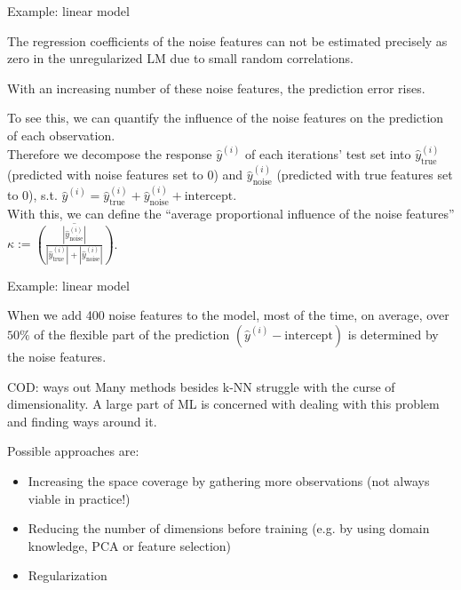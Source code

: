 \documentclass[11pt,compress,t,notes=noshow, xcolor=table]{beamer}
\begin{document}
\begin{framei}{Example: linear model}
\item The regression coefficients of the noise features can not be estimated precisely as zero in the unregularized LM due to small random correlations.
\item With an increasing number of these noise features, the prediction error rises.
\item To see this, we can quantify the influence of the noise features on the prediction of each observation. \\
Therefore we decompose the response $\hat y^{(i)}$ of each iterations' test set into $\hat y^{(i)}_{\text{true}}$ (predicted with noise features set to 0) and $\hat y^{(i)}_{\text{noise}}$ (predicted with true features set to 0), s.t. $\hat y^{(i)} =  \hat y^{(i)}_{\text{true}} + \hat y^{(i)}_{\text{noise}} + \text{intercept}$. \\
With this, we can define the \enquote{average proportional influence of the noise features} $\kappa := \overline{( \frac{|\hat y^{(i)}_{\text{noise}}|}{|\hat y^{(i)}_{\text{true}}| + |\hat y^{(i)}_{\text{noise}}|} )}$.
\end{framei}

\begin{framev}{Example: linear model}

When we add 400 noise features to the model, most of the time, on average, over $50\%$ of the flexible part of the prediction $(\hat y^{(i)} - \text{intercept})$ is determined by the noise features.
\end{framev}

\begin{framev}{COD: ways out}
Many methods besides k-NN struggle with the curse of dimensionality. A large part of ML is concerned with dealing with this problem and finding ways around it.

\vfill

Possible approaches are:
\begin{itemize}
\item Increasing the space coverage by gathering more observations (not always viable in practice!)
\item Reducing the number of dimensions before training (e.g. by using domain knowledge, PCA or feature selection)
\item Regularization
\end{itemize}
\vfill
\end{framev}

\endlecture
\end{document}
